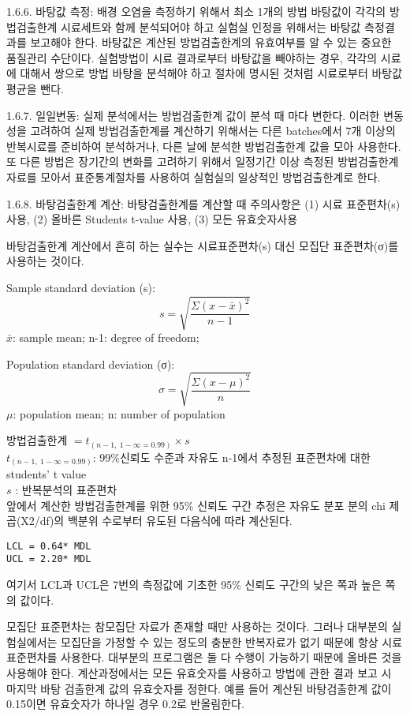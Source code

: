 \documentclass[
]{book}
\begin{document}
1.6.6. 바탕값 측정: 배경 오염을 측정하기 위해서 최소 1개의 방법 바탕값이 각각의 방법검출한계 시료세트와 함께 분석되어야 하고 실험실 인정을 위해서는 바탕값 측정결과를 보고해야 한다. 바탕값은 계산된 방법검출한계의 유효여부를 알 수 있는 중요한 품질관리 수단이다. 실험방법이 시료 결과로부터 바탕값을 빼야하는 경우, 각각의 시료에 대해서 쌍으로 방법 바탕을 분석해야 하고 절차에 명시된 것처럼 시료로부터 바탕값 평균을 뺀다.

1.6.7. 일일변동: 실제 분석에서는 방법검출한계 값이 분석 때 마다 변한다. 이러한 변동성을 고려하여 실제 방법검출한계를 계산하기 위해서는 다른 batches에서 7개 이상의 반복시료를 준비하여 분석하거나, 다른 날에 분석한 방법검출한계 값을 모아 사용한다. 또 다른 방법은 장기간의 변화를 고려하기 위해서 일정기간 이상 측정된 방법검출한계 자료를 모아서 표준통계절차를 사용하여 실험실의 일상적인 방법검출한계로 한다.

1.6.8. 바탕검출한계 계산: 바탕검출한계를 계산할 때 주의사항은
(1) 시료 표준편차(s) 사용,
(2) 올바른 Students t-value 사용,
(3) 모든 유효숫자사용

바탕검출한계 계산에서 흔히 하는 실수는 시료표준편차(s) 대신 모집단 표준편차(σ)를 사용하는 것이다.

Sample standard deviation (s):\\
\[
s=\sqrt{\frac {\Sigma {(x- \bar x)}^{2}} {n-1}}
\]
\(\bar x\): sample mean; n-1: degree of freedom;

Population standard deviation (σ):
\[
\sigma=\sqrt{\frac {\Sigma {(x- \mu)}^{2}} {n}}
\]
\(\mu\): population mean; n: number of population

방법검출한계 \(={t_{(n-1, ~1-\infty=0.99)}\times s}\)\\
\(t_{(n-1, ~1-\infty=0.99)}\): 99\%신뢰도 수준과 자유도 n-1에서 추정된 표준편차에 대한 students' t value\\
\(s\) : 반복분석의 표준편차\\

앞에서 계산한 방법검출한계를 위한 95\% 신뢰도 구간 추정은 자유도 분포 분의 chi 제곱(X2/df)의 백분위 수로부터 유도된 다음식에 따라 계산된다.

\begin{verbatim}
LCL = 0.64* MDL
UCL = 2.20* MDL
\end{verbatim}

여기서 LCL과 UCL은 7번의 측정값에 기초한 95\% 신뢰도 구간의 낮은 쪽과 높은 쪽의 값이다.

모집단 표준편차는 참모집단 자료가 존재할 때만 사용하는 것이다. 그러나 대부분의 실험실에서는 모집단을 가정할 수 있는 정도의 충분한 반복자료가 없기 때문에 항상 시료 표준편차를 사용한다. 대부분의 프로그램은 둘 다 수행이 가능하기 때문에 올바른 것을 사용해야 한다. 계산과정에서는 모든 유효숫자를 사용하고 방법에 관한 결과 보고 시 마지막 바탕 검출한계 값의 유효숫자를 정한다. 예를 들어 계산된 바탕검출한계 값이 0.15이면 유효숫자가 하나일 경우 0.2로 반올림한다.
\end{document}
